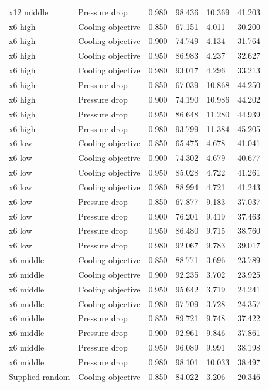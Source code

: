 \begin{longtable}{llllll}
x12 middle & Pressure drop & 0.980 & 98.436 & 10.369 & 41.203\\
x6 high & Cooling objective & 0.850 & 67.151 & 4.011 & 30.200\\
x6 high & Cooling objective & 0.900 & 74.749 & 4.134 & 31.764\\
x6 high & Cooling objective & 0.950 & 86.983 & 4.237 & 32.627\\
x6 high & Cooling objective & 0.980 & 93.017 & 4.296 & 33.213\\
x6 high & Pressure drop & 0.850 & 67.039 & 10.868 & 44.250\\
x6 high & Pressure drop & 0.900 & 74.190 & 10.986 & 44.202\\
x6 high & Pressure drop & 0.950 & 86.648 & 11.280 & 44.939\\
x6 high & Pressure drop & 0.980 & 93.799 & 11.384 & 45.205\\
x6 low & Cooling objective & 0.850 & 65.475 & 4.678 & 41.041\\
x6 low & Cooling objective & 0.900 & 74.302 & 4.679 & 40.677\\
x6 low & Cooling objective & 0.950 & 85.028 & 4.722 & 41.261\\
x6 low & Cooling objective & 0.980 & 88.994 & 4.721 & 41.243\\
x6 low & Pressure drop & 0.850 & 67.877 & 9.183 & 37.037\\
x6 low & Pressure drop & 0.900 & 76.201 & 9.419 & 37.463\\
x6 low & Pressure drop & 0.950 & 86.480 & 9.715 & 38.760\\
x6 low & Pressure drop & 0.980 & 92.067 & 9.783 & 39.017\\
x6 middle & Cooling objective & 0.850 & 88.771 & 3.696 & 23.789\\
x6 middle & Cooling objective & 0.900 & 92.235 & 3.702 & 23.925\\
x6 middle & Cooling objective & 0.950 & 95.642 & 3.719 & 24.241\\
x6 middle & Cooling objective & 0.980 & 97.709 & 3.728 & 24.357\\
x6 middle & Pressure drop & 0.850 & 89.721 & 9.748 & 37.422\\
x6 middle & Pressure drop & 0.900 & 92.961 & 9.846 & 37.861\\
x6 middle & Pressure drop & 0.950 & 96.089 & 9.991 & 38.198\\
x6 middle & Pressure drop & 0.980 & 98.101 & 10.033 & 38.497\\
Supplied random & Cooling objective & 0.850 & 84.022 & 3.206 & 20.346\\

\end{longtable}
